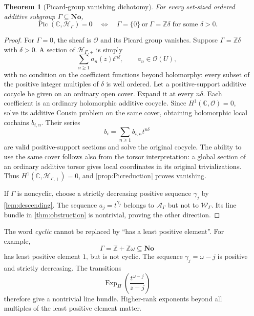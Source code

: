 \documentclass[11pt,letterpaper]{article}
\newtheorem{theorem}{Theorem}[section]
\theoremstyle{definition}
\theoremstyle{remark}
\newcommand{\No}{\mathbf{No}}
\newcommand{\C}{\mathbb C}
\newcommand{\Z}{\mathbb Z}
\newcommand{\OO}{\mathcal O}
\newcommand{\HH}{\mathscr H_\Gamma}
\newcommand{\HP}{\mathscr H_{\Gamma,+}}
\newcommand{\Pic}{\operatorname{Pic}}
\newcommand{\ExpH}{\operatorname{Exp}_{H}}
\numberwithin{equation}{section}
\begin{document}
\begin{theorem}[Picard-group vanishing dichotomy]\label{thm:dichotomy}
For every set-sized ordered additive subgroup $\Gamma\subseteq\No$,
\begin{equation}\label{eq:dichotomy}
 \Pic(\C,\HH)=0
 \quad\Longleftrightarrow\quad
 \Gamma=\{0\}\ \text{or}\ \Gamma=\Z\delta\text{ for some }\delta>0.
\end{equation}
\end{theorem}
\begin{proof}
For $\Gamma=0$, the sheaf is $\OO$ and its Picard group vanishes. Suppose $\Gamma=\Z\delta$ with $\delta>0$. A section of $\HP$ is simply
\[
 \sum_{n\ge1}a_n(z)t^{n\delta},\qquad a_n\in\OO(U),
\]
with no condition on the coefficient functions beyond holomorphy: every subset of the positive integer multiples of $\delta$ is well ordered. Let a positive-support additive cocycle be given on an ordinary open cover. Expand it at every $n\delta$. Each coefficient is an ordinary holomorphic additive cocycle. Since $H^1(\C,\OO)=0$, solve its additive Cousin problem on the same cover, obtaining holomorphic local cochains $b_{i,n}$. Their series
\[
 b_i=\sum_{n\ge1}b_{i,n}t^{n\delta}
\]
are valid positive-support sections and solve the original cocycle. The ability to use the same cover follows also from the torsor interpretation: a global section of an ordinary additive torsor gives local coordinates in its original trivializations. Thus $H^1(\C,\HP)=0$, and \cref{prop:Picreduction} proves vanishing.

If $\Gamma$ is noncyclic, choose a strictly decreasing positive sequence $\gamma_j$ by \cref{lem:descending}. The sequence $a_j=t^{\gamma_j}$ belongs to $\mathcal A_\Gamma$ but not to $\mathcal W_\Gamma$. Its line bundle in \cref{thm:obstruction} is nontrivial, proving the other direction.
\end{proof}
The word \emph{cyclic} cannot be replaced by ``has a least positive element''. For example,
\[
 \Gamma=\Z+\Z\omega\subseteq\No
\]
has least positive element $1$, but is not cyclic. The sequence $\gamma_j=\omega-j$ is positive and strictly decreasing. The transitions
\[
 \ExpH\!\left(\frac{t^{\omega-j}}{z-j}\right)
\]
therefore give a nontrivial line bundle. Higher-rank exponents beyond all multiples of the least positive element matter.
\end{document}
